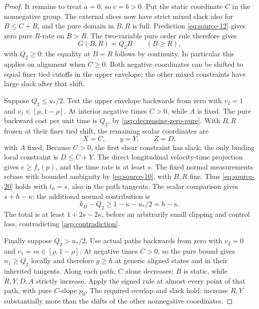 \begin{proof}
It remains to treat \(a=0\), so \(c=b>0\).
Put the static coordinate \(C\) in the nonnegative group.
The external slices now have strict mixed slack also for
\(B\le C+R\), and the pure domain in \(B,R\) is full.
Prediction \eqref{eq:source-12} gives zero pure \(R\)-rate
on \(B>R\). The two-variable pure order rule therefore gives
\begin{equation}\label{asp:decreasing-zero-pure}
G(B,R)=Q_2 B\qquad(B\ge R),
\end{equation}
with \(Q_2\ge0\); the equality at \(B=R\) follows by
continuity. In particular this applies on alignment when
\(C\ge0\). Both negative coordinates can be shifted to
equal finer tied cutoffs in the upper envelope; the other mixed
constraints have large slack after that shift.

Suppose \(Q_2\le u_*/2\). Test the upper envelope
backwards from zero with \(v_2=1\) and
\(v_1\in[\rho,1-\rho]\). At interior negative times
\(C>0\), while \(A\) is fixed. The pure backward cost
per unit time is \(Q_2\), by
\eqref{asp:decreasing-zero-pure}. With \(B,R\) frozen
at their finer tied shift, the remaining scalar coordinates are
\[
X=C,\qquad y=Y,\qquad Z=D,
\]
with \(A\) fixed. Because \(C>0\), the first shear
constraint has slack; the only binding local constraint is
\(D\le C+Y\). The direct longitudinal velocity-time
projection gives \(e\ge f_s(p)\), and the time rate
is at least \(s\). The fixed normal measurements rebase
with bounded ambiguity by \eqref{eq:source-10}, with
\(B,R\) fine. Thus \eqref{eq:source-20} holds with
\(t_0=s\), also in the path tangents. The scalar comparison
gives \(s+h-\kappa\); the additional normal contribution is
\[
k_B-Q_2\ge1-\kappa-u_*/2=h-\kappa.
\]
The total is at least \(1+2s-2\kappa\), before an
arbitrarily small clipping and control loss, contradicting
\eqref{asp:contradiction}.

Finally suppose \(Q_2>u_*/2\). Use actual paths
backwards from zero with \(v_2=0\) and
\(v_1=m\in[\rho,1-\rho]\). At negative times \(C>0\),
so the pure bound gives \(n_1\ge Q_2\) locally and
therefore \(g\ge h\) at generic aligned states and in
their inherited tangents. Along each path, \(C\) alone
decreases; \(B\) is static, while \(R,Y,D,A\) strictly
increase. Apply the signed rule at almost every point of that
path, with pure \(C\)-slope \(p_0\). The required
overlap and slack hold: increase \(R,Y\) substantially
more than the shifts of the other nonnegative coordinates.


\end{proof}
